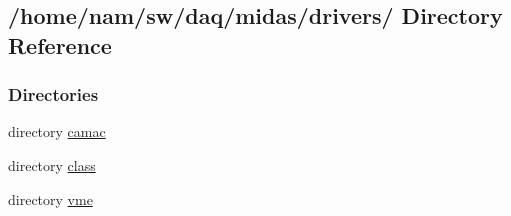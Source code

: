 \subsection{/home/nam/sw/daq/midas/drivers/ Directory Reference}
\label{dir_3a31cb640e3adcf1204f611a3086db97}
\subsubsection*{Directories}
\begin{DoxyCompactItemize}
\item 
directory \hyperlink{dir_ccf2f27fc10a840a0860d6cbd702cf69}{camac}
\item 
directory \hyperlink{dir_ac683fcc8bf5e14e49bc95edd965e9e1}{class}
\item 
directory \hyperlink{dir_a3208d6d4225da852e293df4c284fe6b}{vme}
\end{DoxyCompactItemize}
